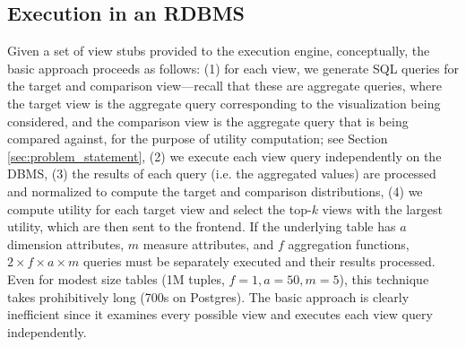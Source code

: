 \subsection{Execution in an RDBMS}
\label{sec:basic_framework}
Given a set of view stubs provided to the execution engine, conceptually,
the basic approach proceeds as follows:
(1) for each view, we generate SQL queries for the target and
comparison view---recall that these are aggregate queries, where
the target view is the aggregate query corresponding 
to the visualization being considered, and the comparison
view is the aggregate query that is being compared against,
for the purpose of utility computation;
see Section \ref{sec:problem_statement}, 
(2) we execute each view query independently on the DBMS, 
(3) the results of each query (i.e. the aggregated values) are processed and
normalized to compute the target and comparison distributions, 
(4) we compute utility for each target view 
and select the top-$k$ views with the largest utility,
which are then sent to the frontend.
If the underlying table has $a$ dimension attributes, $m$ measure attributes,
and $f$ aggregation functions, 
$2\times f \times a \times  m$ queries must be separately executed and their results
processed. Even for modest size tables (1M tuples, $f = 1, a = 50, m=5$), this
technique takes prohibitively long (700s on Postgres). The basic approach is
clearly inefficient since it examines every possible view and executes each view
query independently.



